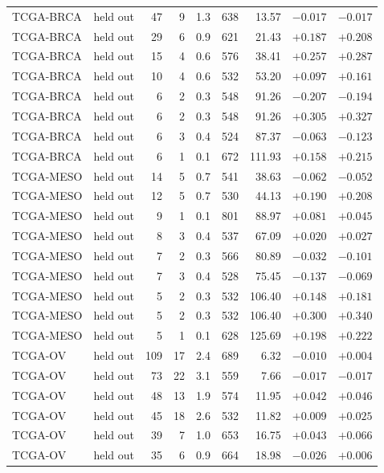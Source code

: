 \begin{longtable}{@{}llrrrrrrr@{}}
TCGA-BRCA & held out & 47 & 9 & 1.3 & 638 & 13.57 & $-0.017$ & $-0.017$\\
TCGA-BRCA & held out & 29 & 6 & 0.9 & 621 & 21.43 & $+0.187$ & $+0.208$\\
TCGA-BRCA & held out & 15 & 4 & 0.6 & 576 & 38.41 & $+0.257$ & $+0.287$\\
TCGA-BRCA & held out & 10 & 4 & 0.6 & 532 & 53.20 & $+0.097$ & $+0.161$\\
TCGA-BRCA & held out & 6 & 2 & 0.3 & 548 & 91.26 & $-0.207$ & $-0.194$\\
TCGA-BRCA & held out & 6 & 2 & 0.3 & 548 & 91.26 & $+0.305$ & $+0.327$\\
TCGA-BRCA & held out & 6 & 3 & 0.4 & 524 & 87.37 & $-0.063$ & $-0.123$\\
TCGA-BRCA & held out & 6 & 1 & 0.1 & 672 & 111.93 & $+0.158$ & $+0.215$\\
TCGA-MESO & held out & 14 & 5 & 0.7 & 541 & 38.63 & $-0.062$ & $-0.052$\\
TCGA-MESO & held out & 12 & 5 & 0.7 & 530 & 44.13 & $+0.190$ & $+0.208$\\
TCGA-MESO & held out & 9 & 1 & 0.1 & 801 & 88.97 & $+0.081$ & $+0.045$\\
TCGA-MESO & held out & 8 & 3 & 0.4 & 537 & 67.09 & $+0.020$ & $+0.027$\\
TCGA-MESO & held out & 7 & 2 & 0.3 & 566 & 80.89 & $-0.032$ & $-0.101$\\
TCGA-MESO & held out & 7 & 3 & 0.4 & 528 & 75.45 & $-0.137$ & $-0.069$\\
TCGA-MESO & held out & 5 & 2 & 0.3 & 532 & 106.40 & $+0.148$ & $+0.181$\\
TCGA-MESO & held out & 5 & 2 & 0.3 & 532 & 106.40 & $+0.300$ & $+0.340$\\
TCGA-MESO & held out & 5 & 1 & 0.1 & 628 & 125.69 & $+0.198$ & $+0.222$\\
TCGA-OV & held out & 109 & 17 & 2.4 & 689 & 6.32 & $-0.010$ & $+0.004$\\
TCGA-OV & held out & 73 & 22 & 3.1 & 559 & 7.66 & $-0.017$ & $-0.017$\\
TCGA-OV & held out & 48 & 13 & 1.9 & 574 & 11.95 & $+0.042$ & $+0.046$\\
TCGA-OV & held out & 45 & 18 & 2.6 & 532 & 11.82 & $+0.009$ & $+0.025$\\
TCGA-OV & held out & 39 & 7 & 1.0 & 653 & 16.75 & $+0.043$ & $+0.066$\\
TCGA-OV & held out & 35 & 6 & 0.9 & 664 & 18.98 & $-0.026$ & $+0.006$\\

\end{longtable}
